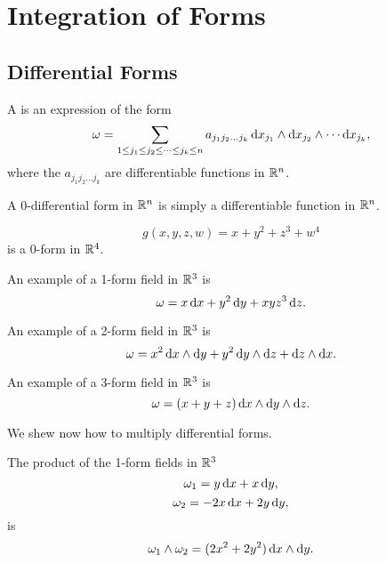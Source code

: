 \chapter{Integration of Forms} \label{ch:integralofforms}

\section{Differential Forms}


\begin{df}
A  is an expression
of the form
$$\omega =  \dsum _{ 1 \leq j_1 \leq j_2 \leq \cdots \leq j_k \leq n} a_{j_1j_2\ldots j_k}\d{x_{j_1}} \wedge \d{x_{j_2}} \wedge \cdots \d{x_{j_k}},
$$where the $a_{j_1j_2\ldots j_k}$ are differentiable
functions in $\mathbb{R}^n$.
\end{df}

A $0$-differential form in $\mathbb{R}^n$ is simply a differentiable
function in $\mathbb{R}^n$.


\begin{exa}
$$g(x, y, z, w) = x + y^2 + z^3 + w^4$$is a 0-form in $\mathbb{R}^4$.
\end{exa}
\begin{exa}
An example of a  1-form field in $\mathbb{R}^3$ is
$$\omega = x\d{x}+ y^2\d{y} + xyz^3\d{z}.$$
\end{exa}
\begin{exa}
An example of a  2-form field in $\mathbb{R}^3$ is
$$\omega = x^2\d{x}\wedge \d{y} + y^2\d{y} \wedge \d{z} + \d{z} \wedge \d{x}.$$
\end{exa}
\begin{exa}
An example of a  3-form  field in $\mathbb{R}^3$ is
$$\omega = (x + y + z)\d{x}\wedge \d{y} \wedge \d{z}.$$
\end{exa}
We shew now how to multiply differential forms.
\begin{exa}
The product of the 1-form fields in $\mathbb{R}^3$
$$\omega_1 = y\d{x}+ x\d{y},$$
$$\omega_2 = -2x\d{x}+ 2y\d{y},$$is
$$\omega_1 \wedge \omega_2 = (2x^2 + 2y^2)\d{x}\wedge \d{y}.$$

\end{exa}

